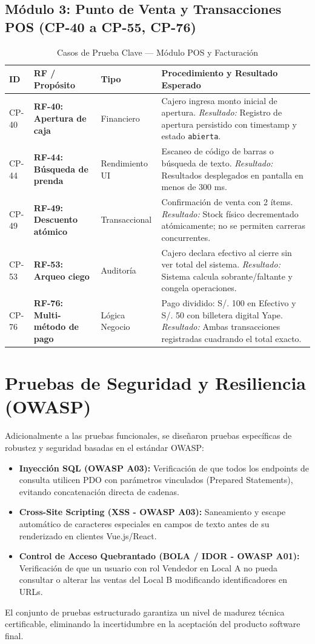\subsection{Módulo 3: Punto de Venta y Transacciones POS (CP-40 a CP-55, CP-76)}
\begin{table}[H]
\centering
\small
\begin{tabularx}{\textwidth}{>{\ttfamily\centering}p{1.4cm} >{\raggedright\bfseries}p{3.4cm} >{\raggedright}p{2.3cm} Y}
\toprule
\textbf{ID} & \textbf{RF / Propósito} & \textbf{Tipo} & \textbf{Procedimiento y Resultado Esperado} \\
\midrule
CP-40 & RF-40: Apertura de caja & Financiero & Cajero ingresa monto inicial de apertura. \textit{Resultado:} Registro de apertura persistido con timestamp y estado \texttt{abierta}. \\
\addlinespace
CP-44 & RF-44: Búsqueda de prenda & Rendimiento UI & Escaneo de código de barras o búsqueda de texto. \textit{Resultado:} Resultados desplegados en pantalla en menos de 300 ms. \\
\addlinespace
CP-49 & RF-49: Descuento atómico & Transaccional & Confirmación de venta con 2 ítems. \textit{Resultado:} Stock físico decrementado atómicamente; no se permiten carreras concurrentes. \\
\addlinespace
CP-53 & RF-53: Arqueo ciego & Auditoría & Cajero declara efectivo al cierre sin ver total del sistema. \textit{Resultado:} Sistema calcula sobrante/faltante y congela operaciones. \\
\addlinespace
CP-76 & RF-76: Multi-método de pago & Lógica Negocio & Pago dividido: S/. 100 en Efectivo y S/. 50 con billetera digital Yape. \textit{Resultado:} Ambas transacciones registradas cuadrando el total exacto. \\
\bottomrule
\end{tabularx}
\caption{Casos de Prueba Clave --- Módulo POS y Facturación}
\label{tab:cp_modulo3}
\end{table}

\section{Pruebas de Seguridad y Resiliencia (OWASP)}
Adicionalmente a las pruebas funcionales, se diseñaron pruebas específicas de robustez y seguridad basadas en el estándar OWASP:
\begin{itemize}
    \item \textbf{Inyección SQL (OWASP A03):} Verificación de que todos los endpoints de consulta utilicen PDO con parámetros vinculados (Prepared Statements), evitando concatenación directa de cadenas.
    \item \textbf{Cross-Site Scripting (XSS - OWASP A03):} Saneamiento y escape automático de caracteres especiales en campos de texto antes de su renderizado en clientes Vue.js/React.
    \item \textbf{Control de Acceso Quebrantado (BOLA / IDOR - OWASP A01):} Verificación de que un usuario con rol Vendedor en Local A no pueda consultar o alterar las ventas del Local B modificando identificadores en URLs.
\end{itemize}

El conjunto de pruebas estructurado garantiza un nivel de madurez técnica certificable, eliminando la incertidumbre en la aceptación del producto software final.
